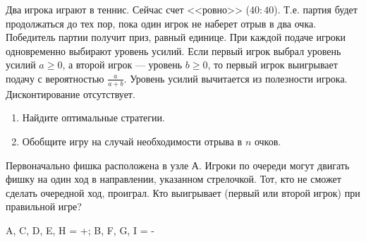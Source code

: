 \begin{problem}
\begin{source}
\cite{lones:dtc}\end{source}
Два игрока играют в теннис. Сейчас счет <<ровно>> ($40:40$). Т.е. партия будет продолжаться до тех пор, пока один игрок не наберет отрыв в два очка. Победитель партии получит приз, равный единице. При каждой подаче игроки одновременно выбирают уровень усилий. Если первый игрок выбрал уровень усилий $a\ge 0$, а второй игрок --- уровень $b\ge 0$, то первый игрок выигрывает подачу с вероятностью $\frac{a}{a+b}$. Уровень усилий вычитается из полезности игрока. Дисконтирование отсутствует. \par
\begin{enumerate}
\item  Найдите оптимальные стратегии. \par
\item Обобщите игру на случай необходимости отрыва в $n$ очков. \par
\end{enumerate}




\begin{sol}

\end{sol}
\end{problem}



\begin{problem}

Первоначально фишка расположена в узле А. Игроки по очереди могут двигать фишку на один ход в направлении, указанном стрелочкой. Тот, кто не сможет сделать очередной ход, проиграл. Кто выигрывает (первый или второй игрок) при правильной игре?

\begin{sol}
 A, C, D, E, H = +; B, F, G, I = -
\end{sol}
\end{problem}



